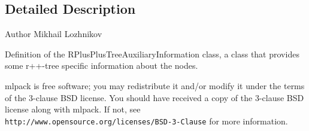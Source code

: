 \subsection{Detailed Description}
\begin{DoxyAuthor}{Author}
Mikhail Lozhnikov
\end{DoxyAuthor}
Definition of the R\+Plus\+Plus\+Tree\+Auxiliary\+Information class, a class that provides some r++-\/tree specific information about the nodes.

mlpack is free software; you may redistribute it and/or modify it under the terms of the 3-\/clause B\+SD license. You should have received a copy of the 3-\/clause B\+SD license along with mlpack. If not, see {\tt http\+://www.\+opensource.\+org/licenses/\+B\+S\+D-\/3-\/\+Clause} for more information. 
